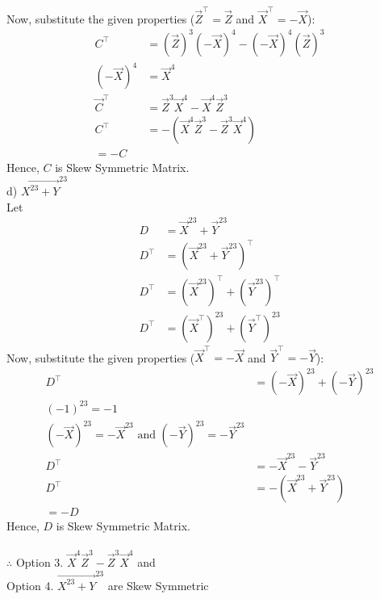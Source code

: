 \documentclass[journal]{IEEEtran}
\begin{document}
Now, substitute the given properties ($\vec{Z}^\top = \vec{Z}$ and $\vec{X}^\top = -\vec{X}$):
\begin{align}
C^\top&= (\vec{Z})^3(-\vec{X})^4 - (-\vec{X})^4(\vec{Z})^3 \\
(-\vec{X})^4 &= \vec{X}^4 \\
\vec{C}^\top &= \vec{Z}^3\vec{X}^4 - \vec{X}^4\vec{Z}^3 \\
C^\top &= -(\vec{X}^4\vec{Z}^3 - \vec{Z}^3\vec{X}^4)\\
=-C
\end{align}
Hence, $C$ is Skew Symmetric Matrix.\\

d) $\vec{X^{23} + Y}^{23}$\\Let
\begin{align}
D&=\vec{X}^{23} + \vec{Y}^{23}\\
D^\top &= (\vec{X}^{23} + \vec{Y}^{23})^\top \\
D^\top &= (\vec{X}^{23})^\top + (\vec{Y}^{23})^\top \\
D^\top &= (\vec{X}^\top)^{23} + (\vec{Y}^\top)^{23}
\end{align}
Now, substitute the given properties ($\vec{X}^\top = -\vec{X}$ and $\vec{Y}^\top = -\vec{Y}$):
\begin{align}
D^\top &= (-\vec{X})^{23} + (-\vec{Y})^{23} \\
(-1)^{23} = -1\\
(-\vec{X})^{23} = -\vec{X}^{23} \text{ and } (-\vec{Y})^{23} = -\vec{Y}^{23}\\
D^\top &= -\vec{X}^{23} - \vec{Y}^{23} \\
D^\top &= -(\vec{X}^{23} + \vec{Y}^{23})\\
=-D
\end{align}
Hence, $D$ is Skew Symmetric Matrix.\\\\
$\therefore$ Option 3. $\vec{X}^4\vec{Z}^3 - \vec{Z}^3\vec{X}^4$ and\\ 
Option 4. $\vec{X^{23} + Y}^{23}$ are Skew Symmetric
\end{document}

